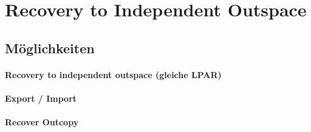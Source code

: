 \chapter[Migration]{Recovery to Independent Outspace}

\section{Möglichkeiten}
\subsubsection{Recovery to independent outspace (gleiche LPAR)}
\loreipsum

\subsubsection{Export / Import}
\loreipsum

\subsubsection{Recover Outcopy}
\loreipsum

